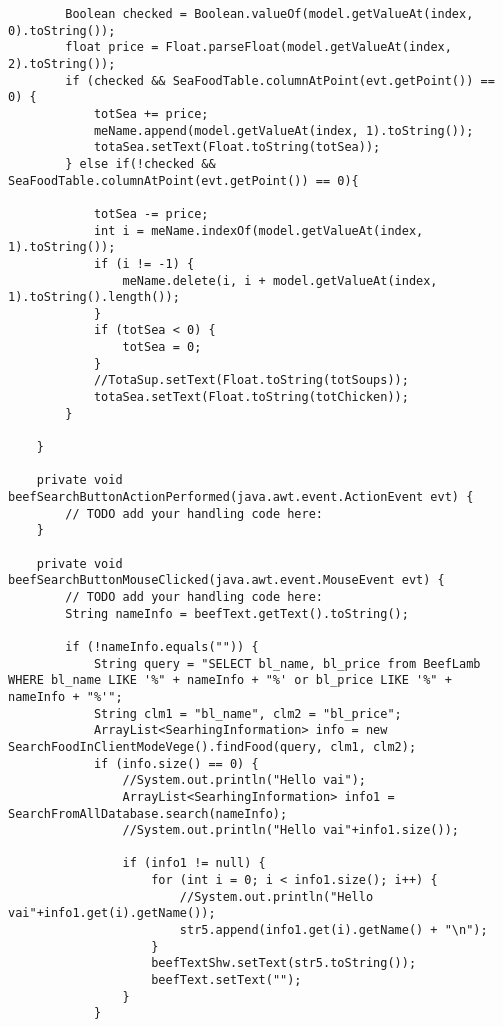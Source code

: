 \documentclass[12pt,a4paper]{article}
\begin{document}
\begin{lstlisting}
        Boolean checked = Boolean.valueOf(model.getValueAt(index, 0).toString());
        float price = Float.parseFloat(model.getValueAt(index, 2).toString());
        if (checked && SeaFoodTable.columnAtPoint(evt.getPoint()) == 0) {
            totSea += price;
            meName.append(model.getValueAt(index, 1).toString());
            totaSea.setText(Float.toString(totSea));
        } else if(!checked && SeaFoodTable.columnAtPoint(evt.getPoint()) == 0){
            
            totSea -= price;
            int i = meName.indexOf(model.getValueAt(index, 1).toString());
            if (i != -1) {
                meName.delete(i, i + model.getValueAt(index, 1).toString().length());
            }
            if (totSea < 0) {
                totSea = 0;
            }
            //TotaSup.setText(Float.toString(totSoups));
            totaSea.setText(Float.toString(totChicken));
        }

    }                                         

    private void beefSearchButtonActionPerformed(java.awt.event.ActionEvent evt) {                                                 
        // TODO add your handling code here:
    }                                                

    private void beefSearchButtonMouseClicked(java.awt.event.MouseEvent evt) {                                              
        // TODO add your handling code here:
        String nameInfo = beefText.getText().toString();

        if (!nameInfo.equals("")) {
            String query = "SELECT bl_name, bl_price from BeefLamb WHERE bl_name LIKE '%" + nameInfo + "%' or bl_price LIKE '%" + nameInfo + "%'";
            String clm1 = "bl_name", clm2 = "bl_price";
            ArrayList<SearhingInformation> info = new SearchFoodInClientModeVege().findFood(query, clm1, clm2);
            if (info.size() == 0) {
                //System.out.println("Hello vai");
                ArrayList<SearhingInformation> info1 = SearchFromAllDatabase.search(nameInfo);
                //System.out.println("Hello vai"+info1.size());

                if (info1 != null) {
                    for (int i = 0; i < info1.size(); i++) {
                        //System.out.println("Hello vai"+info1.get(i).getName());
                        str5.append(info1.get(i).getName() + "\n");
                    }
                    beefTextShw.setText(str5.toString());
                    beefText.setText("");
                }
            }


\end{lstlisting}
\end{document}
